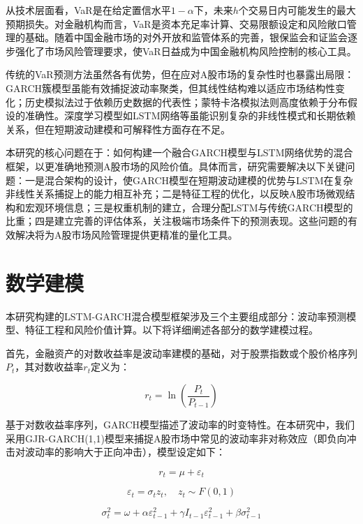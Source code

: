 \documentclass[12pt, a4paper]{article}
\begin{document}
从技术层面看，VaR是在给定置信水平$1-\alpha$下，未来$h$个交易日内可能发生的最大预期损失。对金融机构而言，VaR是资本充足率计算、交易限额设定和风险敞口管理的基础。随着中国金融市场的对外开放和监管体系的完善，银保监会和证监会逐步强化了市场风险管理要求，使VaR日益成为中国金融机构风险控制的核心工具。

传统的VaR预测方法虽然各有优势，但在应对A股市场的复杂性时也暴露出局限：GARCH簇模型虽能有效捕捉波动率聚类，但其线性结构难以适应市场结构性变化；历史模拟法过于依赖历史数据的代表性；蒙特卡洛模拟法则高度依赖于分布假设的准确性。深度学习模型如LSTM网络等虽能识别复杂的非线性模式和长期依赖关系，但在短期波动建模和可解释性方面存在不足。

本研究的核心问题在于：如何构建一个融合GARCH模型与LSTM网络优势的混合框架，以更准确地预测A股市场的风险价值。具体而言，研究需要解决以下关键问题：一是混合架构的设计，使GARCH模型在短期波动建模的优势与LSTM在复杂非线性关系捕捉上的能力相互补充；二是特征工程的优化，以反映A股市场微观结构和宏观环境信息；三是权重机制的建立，合理分配LSTM与传统GARCH模型的比重；四是建立完善的评估体系，关注极端市场条件下的预测表现。这些问题的有效解决将为A股市场风险管理提供更精准的量化工具。

\section{数学建模}

本研究构建的LSTM-GARCH混合模型框架涉及三个主要组成部分：波动率预测模型、特征工程和风险价值计算。以下将详细阐述各部分的数学建模过程。

首先，金融资产的对数收益率是波动率建模的基础，对于股票指数或个股价格序列$P_t$，其对数收益率$r_t$定义为：

\begin{equation}
r_t = \ln\left(\frac{P_t}{P_{t-1}}\right)
\end{equation}

基于对数收益率序列，GARCH模型描述了波动率的时变特性。在本研究中，我们采用GJR-GARCH(1,1)模型来捕捉A股市场中常见的波动率非对称效应（即负向冲击对波动率的影响大于正向冲击），模型设定如下：

\begin{equation}
r_t = \mu + \varepsilon_t
\end{equation}

\begin{equation}
\varepsilon_t = \sigma_t z_t, \quad z_t \sim F(0,1)
\end{equation}

\begin{equation}
\sigma_t^2 = \omega + \alpha\varepsilon_{t-1}^2 + \gamma I_{t-1}\varepsilon_{t-1}^2 + \beta\sigma_{t-1}^2
\end{equation}
\end{document}
